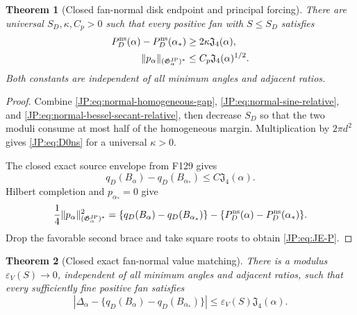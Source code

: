 \documentclass[11pt]{amsart}
\numberwithin{equation}{section}
\newtheorem{theorem}{Theorem}[section]
\theoremstyle{definition}
\theoremstyle{remark}
\newcommand{\Jfour}{\mathfrak J_4}
\newcommand{\Gjp}{\mathfrak G^{\rm JP}}
\begin{document}
\begin{theorem}[Closed fan-normal disk endpoint and principal forcing]
\label{JP:thm:normal-disk-endpoint}
There are universal $S_D,\kappa,C_p>0$ such that every positive fan with
$S\le S_D$ satisfies
\begin{align}
 P_D^{\rm ns}(\alpha)-P_D^{\rm ns}(\alpha_*)
 &\ge2\kappa\Jfour(\alpha),
 \label{JP:eq:D0ns}\\
 \|p_\alpha\|_{(\Gjp_\alpha)^*}
 &\le C_p\Jfour(\alpha)^{1/2}.
 \label{JP:eq:JE-P}
\end{align}
Both constants are independent of all minimum angles and adjacent ratios.
\end{theorem}

\begin{proof}
Combine \eqref{JP:eq:normal-homogeneous-gap},
\eqref{JP:eq:normal-sine-relative}, and
\eqref{JP:eq:normal-bessel-secant-relative}, then decrease $S_D$ so that the
two moduli consume at most half of the homogeneous margin.  Multiplication
by $2\pi d^2$ gives \eqref{JP:eq:D0ns} for a universal $\kappa>0$.

The closed exact source envelope from F129 gives
\[
 q_D(B_\alpha)-q_D(B_{\alpha_*})\le C\Jfour(\alpha).
\]
Hilbert completion and $p_{\alpha_*}=0$ give
\[
 \frac14\|p_\alpha\|_{(\Gjp_\alpha)^*}^2
 =\{q_D(B_\alpha)-q_D(B_{\alpha_*})\}
  -\{P_D^{\rm ns}(\alpha)-P_D^{\rm ns}(\alpha_*)\}.
\]
Drop the favorable second brace and take square roots to obtain
\eqref{JP:eq:JE-P}.
\end{proof}

\begin{theorem}[Closed exact fan-normal value matching]
\label{JP:thm:normal-value-matching}
There is a modulus $\varepsilon_V(S)\to0$, independent of all minimum
angles and adjacent ratios, such that every sufficiently fine positive fan
satisfies
\begin{equation}\label{JP:eq:JE-V}
 \boxed{
 \left|\Delta_\alpha-
 \{q_D(B_\alpha)-q_D(B_{\alpha_*})\}\right|
 \le\varepsilon_V(S)\Jfour(\alpha).}
\end{equation}
\end{theorem}
\end{document}

